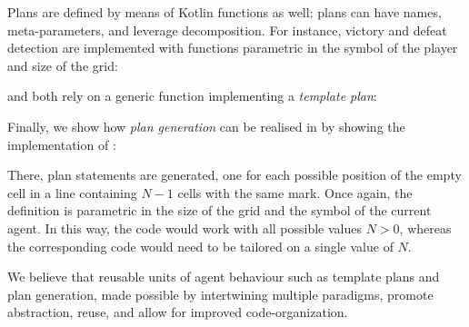 Plans are defined by means of Kotlin functions as well:
\jakta{} plans can have names, meta-parameters, and leverage decomposition.
%
For instance,
victory and defeat detection are implemented with functions parametric in the symbol of the player and size of the grid:
\\
\begin{minipage}[c]{\textwidth}
\end{minipage}
and both rely on a generic  function implementing a \emph{template plan}:
\\
\begin{minipage}[c]{\textwidth}
\end{minipage}
%
%
Finally,
we show how \emph{plan generation} can be realised in \jakta{}
by showing the implementation of :
\\
\begin{minipage}[c]{\textwidth}
\end{minipage}
%
There,  plan statements are generated,
one for each possible position of the empty cell in a line containing $N-1$ cells with the same mark.
%
Once again, the definition is parametric in the size of the grid and the symbol of the current agent.
%
In this way, the \jakta{} code would work with all possible values $N>0$,
whereas the corresponding \agentspeak{} code would need to be tailored on a single value of $N$.

We believe that reusable units of agent behaviour
such as template plans and plan generation,
made possible by intertwining multiple paradigms,
promote abstraction, reuse, and allow for improved code-organization.

